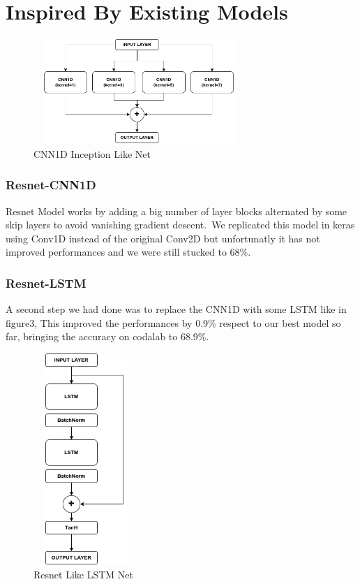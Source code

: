 \documentclass[11pt]{article}
\begin{document}
\section{Inspired By Existing Models}
\begin{figure}[h]
\centering
\includegraphics[width=8cm, height=4cm]{Inception}
\caption{CNN1D Inception Like Net}
\end{figure}

\subsubsection{Resnet-CNN1D}
Resnet Model works by adding a big number of layer blocks alternated by some skip layers to avoid vanishing gradient descent.\
We replicated this model in keras using Conv1D instead of the original Conv2D but unfortunatly it has not improved performances and we were still stucked to 68\%.
\subsubsection{Resnet-LSTM}
A second step we had done was to replace the CNN1D with some LSTM like in figure3,
This improved the performances by 0.9\% respect to our best model so far, bringing the accuracy on codalab to 68.9\%.
\begin{figure}[h]
\centering
\includegraphics[width=4cm, height=8cm,angle =90]{resnet}
\caption{Resnet Like LSTM Net}
\end{figure}
\end{document}
